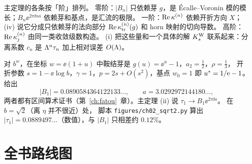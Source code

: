 \begin{remark}[读法]\label{ch1:rem:reading}
主定理的各条按「阶」排列。
零阶：$|B_n|$ 只依赖芽 $g$，是 Écalle--Voronin 模的模长；$B_n\ee^{2\pi\ii na}$ 依赖芽和基点，是汇流的极限。
一阶：$\operatorname{Re}\kappa^{(n)}$ 依赖开折方向 $X$；(iv) 说它分成只依赖芽的法向部分 $\operatorname{Re}\kappa_{\mathrm{tr}}^{(n)}(g)$ 和 horn 映射的切向导数。
高阶：$\operatorname{Re}\kappa^{(n)}_j$ 由同一类收敛级数构造。
(i) 把这些量和一个具体的解 $K^{\mathrm W}_s$ 联系起来：分离系数 $c_n$ 是 $\Lambda^n\tau_n$ 加上相对误差 $O(\Lambda)$。
\end{remark}

\begin{example}[tetration]\label{ch1:ex:tetration-data}
对 $b^w$，在坐标 $w=\ee(1+u)$ 中鞍结芽是 $g(u)=\ee^u-1$，$a_2=\frac12$，$\rho=\frac13$，
开折参数 $s=1-\ee\log b$，$\gamma=1$，$p=2s+O(s^2)$，基点 $w_0=1$ 即 $u^{*}=1/\mathrm{e}-1$。
\cite[\S2.1 与 Prop.~2.6]{KneserPaper} 给出
\[
  |B_1|=0.0890584364122133\ldots,\qquad a=3.0292972144180\ldots ,
\]
两者都有区间算术证书（第~\ref{ch:fatou}~章）。主定理 (ii) 说 $\tau_1\to B_1\ee^{2\pi\ii a}$。
在 $b=\sqrt2$（离 $\eta$ 并不很近）处，
脚本 \texttt{figures/ch02\_sqrt2.py} 算出 $|\tau_1|=0.0889497\ldots$（数值），与 $|B_1|$ 只相差约 $0.12\%$。
\end{example}

\section{全书路线图}\label{ch1:sec:roadmap}

